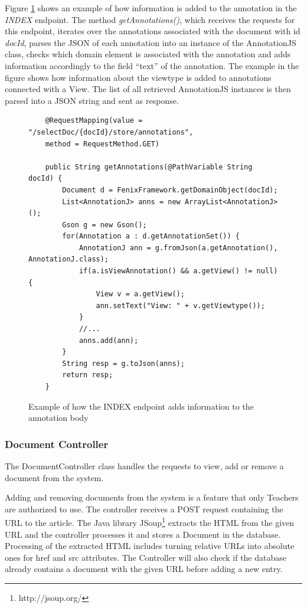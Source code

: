\documentclass{llncs}
\begin{document}
Figure \ref{figure:annotationControllerIndex} shows an example of how information is added to the annotation in the \textit{INDEX} endpoint. The method \textit{getAnnotations()}, which receives the requests for this endpoint, iterates over the annotations associated with the document with id \textit{docId}, parses the JSON of each annotation into an instance of the AnnotationJS class, checks which domain element is associated with the annotation and adds information accordingly to the field ``text'' of the annotation. The example in the figure shows how information about the viewtype is added to annotations connected with a View. The list of all retrieved AnnotationJS instances is then parsed into a JSON string and sent as response.

\begin{figure}
\lstset{style=customjava}
\begin{lstlisting}
	@RequestMapping(value = "/selectDoc/{docId}/store/annotations", 
	method = RequestMethod.GET)
	
	public String getAnnotations(@PathVariable String docId) {
		Document d = FenixFramework.getDomainObject(docId);
		List<AnnotationJ> anns = new ArrayList<AnnotationJ>();
		Gson g = new Gson();
		for(Annotation a : d.getAnnotationSet()) {
			AnnotationJ ann = g.fromJson(a.getAnnotation(), AnnotationJ.class);
			if(a.isViewAnnotation() && a.getView() != null) {
				View v = a.getView();
				ann.setText("View: " + v.getViewtype());
			}
			//...			
			anns.add(ann);
		}
		String resp = g.toJson(anns);
		return resp;
	}		
\end{lstlisting}
\caption{Example of how the INDEX endpoint adds information to the annotation body}
\label{figure:annotationControllerIndex}
\end{figure}

\subsubsection{Document Controller}
\label{subsection:documentController}
The DocumentController class handles the requests to view, add or remove a document from the system.

Adding and removing documents from the system is a feature that only Teachers are authorized to use. The controller receives a POST request containing the URL to the article. The Java library JSoup\footnote{http://jsoup.org/} extracts the HTML from the given URL and the controller processes it and stores a Document in the database. Processing of the extracted HTML includes turning relative URLs into absolute ones for href and src attributes.
The Controller will also check if the database already contains a document with the given URL before adding a new entry. 
\end{document}
